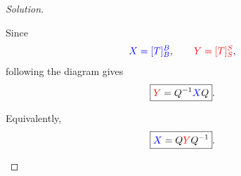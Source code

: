 \documentclass[12pt]{article}
\newenvironment{solution}
{\begin{proof}[Solution]}
{\end{proof}}
\begin{document}
\begin{solution}
\begin{enumerate}
Since
\[
\textcolor{blue}{X=[T]_B^B},
\qquad
\textcolor{red}{Y=[T]_S^S},
\]
following the diagram gives
\[
\boxed{
\textcolor{red}{Y}
=
Q^{-1}\textcolor{blue}{X}Q
}.
\]

Equivalently,
\[
\boxed{
\textcolor{blue}{X}
=
Q\textcolor{red}{Y}Q^{-1}
}.
\]

\end{enumerate}
\end{solution}
\end{document}
